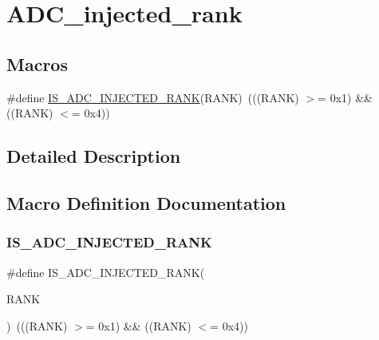 \hypertarget{group___a_d_c__injected__rank}{}\section{A\+D\+C\+\_\+injected\+\_\+rank}
\label{group___a_d_c__injected__rank}
\subsection*{Macros}
\begin{DoxyCompactItemize}
\item 
\#define \mbox{\hyperlink{group___a_d_c__injected__rank_ga63f95f9a45f4d718aabc9e429d860e9d}{I\+S\+\_\+\+A\+D\+C\+\_\+\+I\+N\+J\+E\+C\+T\+E\+D\+\_\+\+R\+A\+NK}}(R\+A\+NK)~(((R\+A\+NK) $>$= 0x1) \&\& ((\+R\+A\+N\+K) $<$= 0x4))
\end{DoxyCompactItemize}


\subsection{Detailed Description}


\subsection{Macro Definition Documentation}
\mbox{\label{group___a_d_c__injected__rank_ga63f95f9a45f4d718aabc9e429d860e9d}} 
\subsubsection{\texorpdfstring{IS\_ADC\_INJECTED\_RANK}{IS\_ADC\_INJECTED\_RANK}}
{\footnotesize\ttfamily \#define I\+S\+\_\+\+A\+D\+C\+\_\+\+I\+N\+J\+E\+C\+T\+E\+D\+\_\+\+R\+A\+NK(\begin{DoxyParamCaption}\item[{}]{R\+A\+NK }\end{DoxyParamCaption})~(((R\+A\+NK) $>$= 0x1) \&\& ((\+R\+A\+N\+K) $<$= 0x4))}

